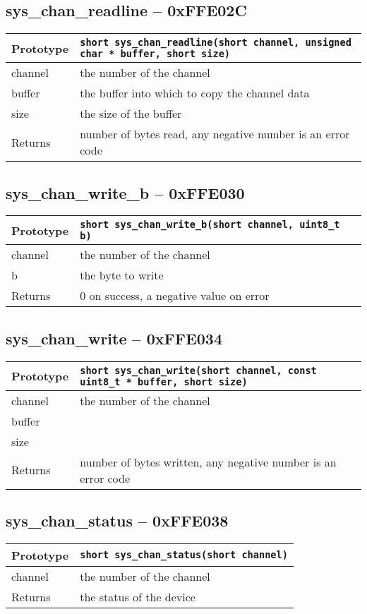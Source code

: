 \subsection*{sys\_chan\_readline -- 0xFFE02C}
\begin{tabular}{|l||l|} \hline
Prototype & \lstinline!short sys_chan_readline(short channel, unsigned char * buffer, short size)! \\ \hline
channel & the number of the channel \\ \hline
buffer & the buffer into which to copy the channel data \\ \hline
size & the size of the buffer \\ \hline
Returns & number of bytes read, any negative number is an error code \\ \hline
\end{tabular}

\subsection*{sys\_chan\_write\_b -- 0xFFE030}
\begin{tabular}{|l||l|} \hline
Prototype & \lstinline!short sys_chan_write_b(short channel, uint8_t b)! \\ \hline
channel & the number of the channel \\ \hline
b & the byte to write \\ \hline
Returns & 0 on success, a negative value on error \\ \hline
\end{tabular}

\subsection*{sys\_chan\_write -- 0xFFE034}
\begin{tabular}{|l||l|} \hline
Prototype & \lstinline!short sys_chan_write(short channel, const uint8_t * buffer, short size)! \\ \hline
channel & the number of the channel \\ \hline
buffer &  \\ \hline
size &  \\ \hline
Returns & number of bytes written, any negative number is an error code \\ \hline
\end{tabular}

\subsection*{sys\_chan\_status -- 0xFFE038}
\begin{tabular}{|l||l|} \hline
Prototype & \lstinline!short sys_chan_status(short channel)! \\ \hline
channel & the number of the channel \\ \hline
Returns & the status of the device \\ \hline
\end{tabular}

